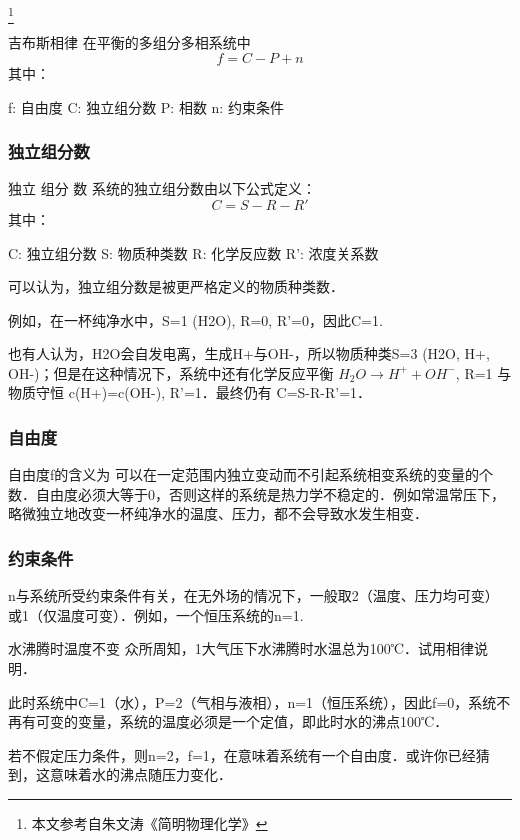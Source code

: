 
\begin{issues}
\end{issues}

\footnote{本文参考自朱文涛《简明物理化学》}

\begin{theorem}{吉布斯相律}
在平衡的多组分多相系统中
\begin{equation}
f=C-P+n
\end{equation}
其中：

f: 自由度
C: 独立组分数
P: 相数
n: 约束条件
\end{theorem}
\subsubsection{独立组分数}
\begin{definition}{独立 组分 数}
系统的独立组分数由以下公式定义：
\begin{equation}
C=S-R-R'
\end{equation}
其中：

C: 独立组分数
S: 物质种类数
R: 化学反应数
R': 浓度关系数
\end{definition}

可以认为，独立组分数是被更严格定义的物质种类数．

例如，在一杯纯净水中，S=1 (H2O), R=0, R'=0，因此C=1.

也有人认为，H2O会自发电离，生成H+与OH-，所以物质种类S=3 (H2O, H+, OH-)；但是在这种情况下，系统中还有化学反应平衡 $H_2O\rightarrow H^++OH^-$, R=1 与物质守恒 c(H+)=c(OH-), R'=1．最终仍有 C=S-R-R'=1．

\subsubsection{自由度}
自由度f的含义为 可以在一定范围内独立变动而不引起系统相变系统的变量的个数．自由度必须大等于0，否则这样的系统是热力学不稳定的．例如常温常压下，略微独立地改变一杯纯净水的温度、压力，都不会导致水发生相变．

\subsubsection{约束条件}
n与系统所受约束条件有关，在无外场的情况下，一般取2（温度、压力均可变）或1（仅温度可变）．例如，一个恒压系统的n=1.

\begin{example}{水沸腾时温度不变}
众所周知，1大气压下水沸腾时水温总为100℃．试用相律说明．

此时系统中C=1（水），P=2（气相与液相），n=1（恒压系统），因此f=0，系统不再有可变的变量，系统的温度必须是一个定值，即此时水的沸点100℃．

若不假定压力条件，则n=2，f=1，在意味着系统有一个自由度．或许你已经猜到，这意味着水的沸点随压力变化．
\end{example}


